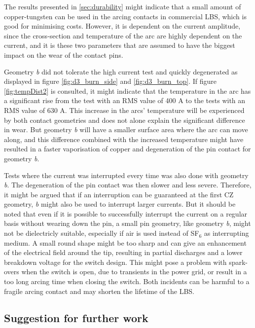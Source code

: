 \documentclass[10pt,a4paper,twoside]{article}
\begin{document}
The results presented in \ref{sec:durability} might indicate that a small amount of copper-tungsten can be used in the arcing contacts in commercial LBS, which is good for minimising costs. However, it is dependent on the current amplitude, since the cross-section and temperature of the arc are highly dependent on the current, and it is these two parameters that are assumed to have the biggest impact on the wear of the contact pins. 

Geometry \textit{b} did not tolerate the high current test and quickly degenerated as displayed in figure \ref{fig:d3_burn_side} and \ref{fig:d3_burn_top}. If figure \ref{fig:tempDist2} is consulted, it might indicate that the temperature in the arc has a significant rise from the test with an RMS value of 400 A to the tests with an RMS value of 630 A. This increase in the arcs' temperature will be experienced by both contact geometries and does not alone explain the significant difference in wear. But geometry \textit{b} will have a smaller surface area where the arc can move along, and this difference combined with the increased temperature might have resulted in a faster vaporisation of copper and degeneration of the pin contact for geometry \textit{b}.

Tests where the current was interrupted every time was also done with geometry \textit{b}. The degeneration of the pin contact was then slower and less severe. Therefore, it might be argued that if an interruption can be guaranteed at the first CZ geometry, \textit{b} might also be used to interrupt larger currents. But it should be noted that even if it is possible to successfully interrupt the current on a regular basis without wearing down the pin, a small pin geometry, like geometry \textit{b}, might not be dielectricly suitable, especially if air is used instead of SF$_6$ as interrupting medium. A small round shape might be too sharp and can give an enhancement of the electrical field around the tip, resulting in partial discharges and a lower breakdown voltage for the switch design. This might pose a problem with spark-overs when the switch is open, due to transients in the power grid, or result in a too long arcing time when closing the switch. Both incidents can be harmful to a fragile arcing contact and may shorten the lifetime of the LBS.
\newpage
\subsection{Suggestion for further work}
\end{document}
